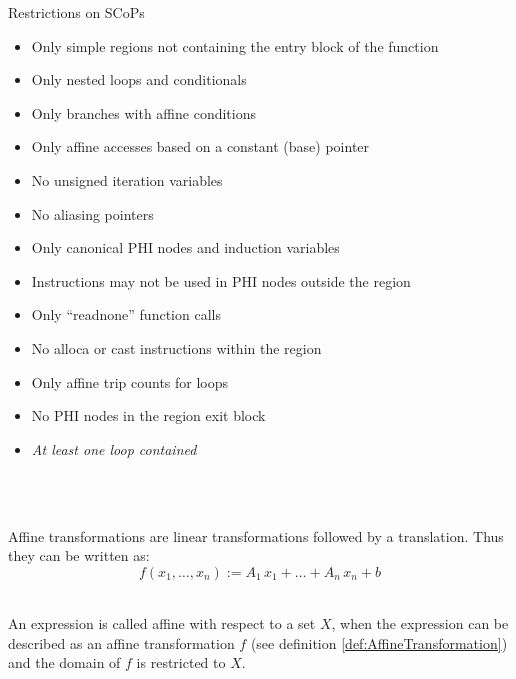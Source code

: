 \begin{table}[htbp] 
  \begin{framed}
  \centering
  \caption{Restrictions on SCoPs}
  \begin{itemize}
      \renewcommand{\labelitemi}{$\triangleright$}
      \item Only simple regions not containing the entry block of the function
      \item Only nested loops and conditionals
      \item Only branches with affine conditions
      \item Only affine accesses based on a constant (base) pointer 
      \item No unsigned iteration variables \footnotemark[1]
      \item No aliasing pointers
      \item Only canonical PHI nodes and induction variables
      \item Instructions may not be used in PHI nodes outside the region\footnotemark[1]
      \item Only ``readnone'' function calls
      \item No alloca or cast instructions within the region
      \item Only affine trip counts for loops
      \item No PHI nodes in the region exit block
      \item \textit{At least one loop contained}
    \end{itemize}
  \label{tab:SCoPRestrictions}
  \end{framed}
\end{table}

~\\
\begin{definition} ~\\
  Affine transformations are linear transformations followed by a translation.
  Thus they can be written as:
  \[ f(x_1,\dots,x_n) := A_1\, x_1 + \dots + A_n\, x_n + b\]

  \label{def:AffineTransformation}
\end{definition}

\begin{definition} ~\\
  An expression is called affine with respect to a set $X$, when the expression
   can be described as an affine transformation $f$
    (see definition \ref{def:AffineTransformation})
  and the domain of $f$ is restricted to $X$. 
  \label{def:AffineWithRespect}
\end{definition}

